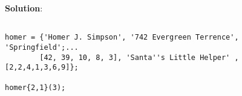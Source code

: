 \begin{outline}[enumerate]
\if {}
\textbf{Solution}: 
{\color{blue}
\begin{lstlisting}

homer = {'Homer J. Simpson', '742 Evergreen Terrence', 'Springfield';...
        [42, 39, 10, 8, 3], 'Santa''s Little Helper' ,[2,2,4,1,3,6,9]};
        
homer{2,1}(3);
\end{lstlisting}
}
\fi

\vfill 



\end{outline}